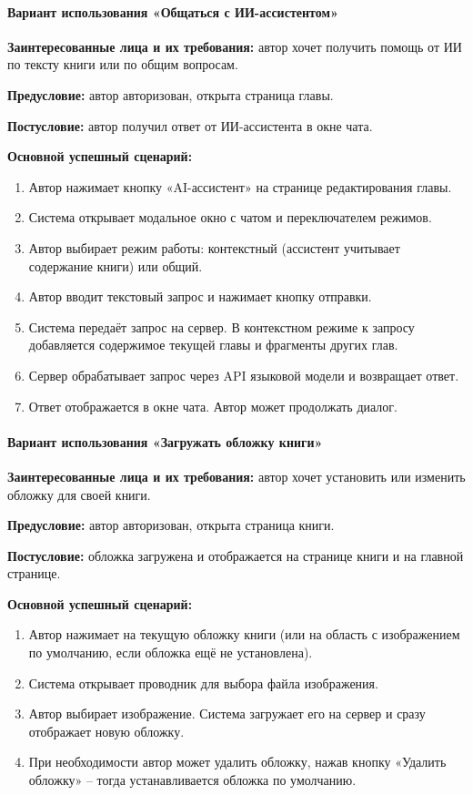 \paragraph{Вариант использования «Общаться с ИИ-ассистентом»}

\textbf{Заинтересованные лица и их требования:} автор хочет получить помощь от ИИ по тексту книги или по общим вопросам.

\textbf{Предусловие:} автор авторизован, открыта страница главы.

\textbf{Постусловие:} автор получил ответ от ИИ-ассистента в окне чата.

\textbf{Основной успешный сценарий:}
\begin{enumerate}
    \item Автор нажимает кнопку «AI-ассистент» на странице редактирования главы.
    \item Система открывает модальное окно с чатом и переключателем режимов.
    \item Автор выбирает режим работы: контекстный (ассистент учитывает содержание книги) или общий.
    \item Автор вводит текстовый запрос и нажимает кнопку отправки.
    \item Система передаёт запрос на сервер. В контекстном режиме к запросу добавляется содержимое текущей главы и фрагменты других глав.
    \item Сервер обрабатывает запрос через API языковой модели и возвращает ответ.
    \item Ответ отображается в окне чата. Автор может продолжать диалог.
\end{enumerate}

\paragraph{Вариант использования «Загружать обложку книги»}

\textbf{Заинтересованные лица и их требования:} автор хочет установить или изменить обложку для своей книги.

\textbf{Предусловие:} автор авторизован, открыта страница книги.

\textbf{Постусловие:} обложка загружена и отображается на странице книги и на главной странице.

\textbf{Основной успешный сценарий:}
\begin{enumerate}
    \item Автор нажимает на текущую обложку книги (или на область с изображением по умолчанию, если обложка ещё не установлена).
    \item Система открывает проводник для выбора файла изображения.
    \item Автор выбирает изображение. Система загружает его на сервер и сразу отображает новую обложку.
    \item При необходимости автор может удалить обложку, нажав кнопку «Удалить обложку» -- тогда устанавливается обложка по умолчанию.
\end{enumerate}

